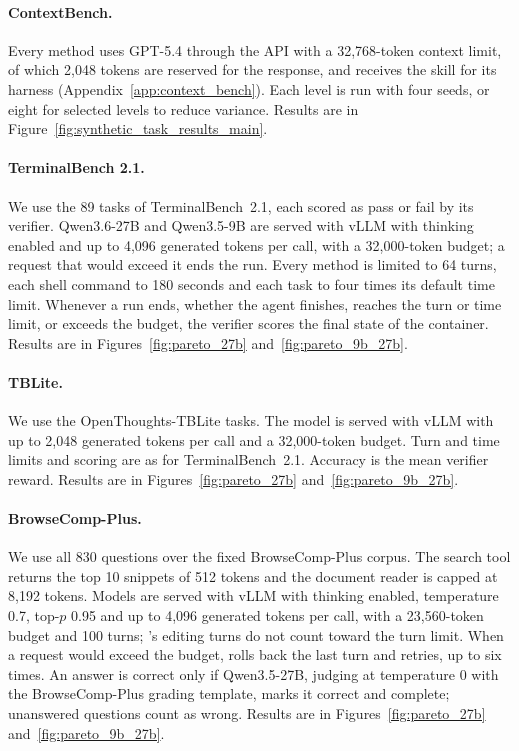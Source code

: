 \paragraph{ContextBench.}
Every method uses GPT-5.4 through the API with a 32{,}768-token context limit, of which 2{,}048 tokens are reserved for the response, and receives the skill for its harness (Appendix~\ref{app:context_bench}). Each level is run with four seeds, or eight for selected levels to reduce variance. Results are in Figure~\ref{fig:synthetic_task_results_main}.

\paragraph{TerminalBench 2.1.}
We use the 89 tasks of TerminalBench~2.1, each scored as pass or fail by its verifier. Qwen3.6-27B and Qwen3.5-9B are served with vLLM with thinking enabled and up to 4{,}096 generated tokens per call, with a 32{,}000-token budget; a request that would exceed it ends the run. Every method is limited to 64 turns, each shell command to 180 seconds and each task to four times its default time limit. Whenever a run ends, whether the agent finishes, reaches the turn or time limit, or exceeds the budget, the verifier scores the final state of the container. Results are in Figures~\ref{fig:pareto_27b} and~\ref{fig:pareto_9b_27b}.

\paragraph{TBLite.}
We use the OpenThoughts-TBLite tasks. The model is served with vLLM with up to 2{,}048 generated tokens per call and a 32{,}000-token budget. Turn and time limits and scoring are as for TerminalBench~2.1. Accuracy is the mean verifier reward. Results are in Figures~\ref{fig:pareto_27b} and~\ref{fig:pareto_9b_27b}.

\paragraph{BrowseComp-Plus.}
We use all 830 questions over the fixed BrowseComp-Plus corpus. The search tool returns the top 10 snippets of 512 tokens and the document reader is capped at 8{,}192 tokens. Models are served with vLLM with thinking enabled, temperature 0.7, top-$p$ 0.95 and up to 4{,}096 generated tokens per call, with a 23{,}560-token budget and 100 turns; \ours{}'s editing turns do not count toward the turn limit. When a request would exceed the budget, \ours{} rolls back the last turn and retries, up to six times. An answer is correct only if Qwen3.5-27B, judging at temperature 0 with the BrowseComp-Plus grading template, marks it correct and complete; unanswered questions count as wrong. Results are in Figures~\ref{fig:pareto_27b} and~\ref{fig:pareto_9b_27b}.

